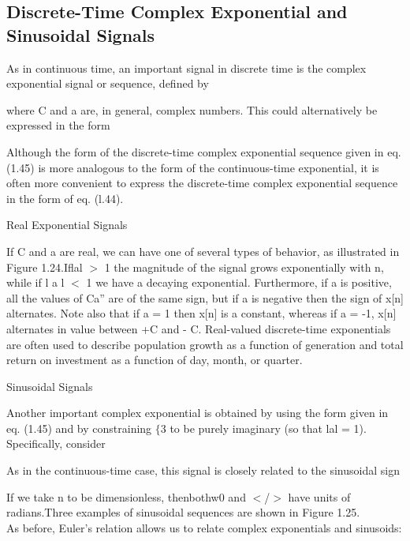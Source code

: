 \documentclass{report}
\begin{document}
\subsection*{Discrete-Time Complex Exponential and Sinusoidal Signals}

As in continuous time, an important signal in discrete time is the complex exponential signal or sequence, defined by



where C and a are, in general, complex numbers. This could alternatively be expressed in the form



Although the form of the discrete-time complex exponential sequence given in eq. (1.45) is more analogous to the form of the continuous-time exponential,
it is often more convenient to express the discrete-time complex exponential sequence in the form of eq. (l.44).



Real Exponential Signals

If C and a are real, we can have one of several types of behavior, as illustrated in Figure 1.24.Iflal $>$ 1 the magnitude of the signal grows exponentially
with n, while if l a l $<$ 1 we have a decaying exponential. Furthermore, if a is positive, all the values of Ca{''} are of the same sign, but if
a is negative then the sign of x[n] alternates. Note also that if a = 1 then x[n] is a constant, whereas if a = -1, x[n] alternates in value between
+C and - C. Real-valued discrete-time exponentials are often used to describe population growth as a function of generation and total return on investment
as a function of day, month, or quarter.

Sinusoidal Signals

Another important complex exponential is obtained by using the form given in eq. (1.45) and by constraining $\{$3 to be purely imaginary (so that
lal = 1). Specifically, consider



As in the continuous-time case, this signal is closely related to the sinusoidal sign



If we take n to be dimensionless, thenbothw0 and $<$/$>$ have units of radians.Three examples of sinusoidal sequences are shown in Figure 1.25.\\
As before, Euler's relation allows us to relate complex exponentials and sinusoids:
\end{document}
